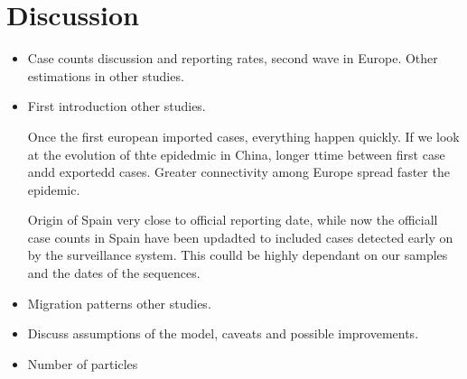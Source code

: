 \chapter{Discussion}

\begin{itemize}
\item Case counts discussion and reporting rates, second wave in Europe. Other estimations in other studies.



\item First introduction other studies. 

Once the first european imported cases, everything happen quickly. If we look at the evolution of thte epidedmic in China, longer ttime between first case andd exportedd cases. Greater connectivity among Europe spread faster the epidemic.

Origin of Spain very close to official reporting date, while now the officiall case counts in Spain have been updadted to included cases detected early on by the surveillance system. This coulld be highly dependant on our samples and the dates of the sequences.

\item Migration patterns other studies.

\item Discuss assumptions of the model, caveats and possible improvements.

\item Number of particles
\end{itemize}